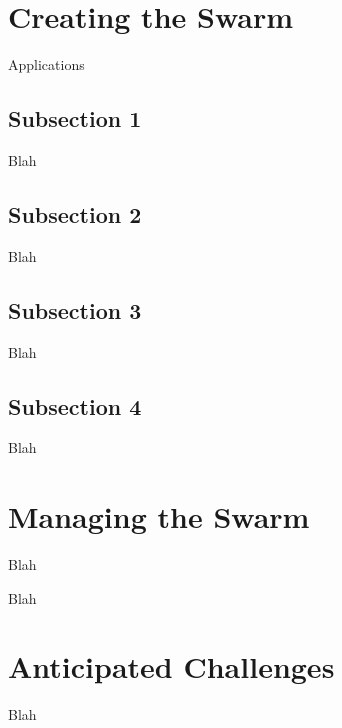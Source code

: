 \section{Creating the Swarm}
Applications 




\subsection{Subsection 1}
Blah 

\subsection{Subsection 2}
Blah

\subsection{Subsection 3}
Blah 

\subsection{Subsection 4}
Blah

\section{Managing the Swarm}
Blah 

\setlength{\parskip}{1em}\noindent 
Blah 

\section{Anticipated Challenges}
Blah 

